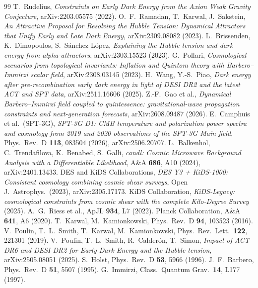 \documentclass[11pt]{article}
\begin{document}
\begin{thebibliography}{99}
 T.~Rudelius, \emph{Constraints on Early Dark Energy from the Axion Weak Gravity Conjecture},
arXiv:2203.05575 (2022).
 O.~F.~Ramadan, T.~Karwal, J.~Sakstein, \emph{An Attractive Proposal for Resolving the Hubble
Tension: Dynamical Attractors that Unify Early and Late Dark Energy}, arXiv:2309.08082 (2023).
 L.~Brissenden, K.~Dimopoulos, S.~S\'anchez L\'opez, \emph{Explaining the Hubble tension and
dark energy from alpha-attractors}, arXiv:2303.15523 (2023).
 G.~Pollari, \emph{Cosmological scenarios from topological invariants: Inflation and Quintom theory
with Barbero--Immirzi scalar field}, arXiv:2308.03145 (2023).
 H.~Wang, Y.-S.~Piao, \emph{Dark energy after pre-recombination early dark energy in light of
DESI DR2 and the latest ACT and SPT data}, arXiv:2511.16606 (2025).
 Z.-F.~Gao et al., \emph{Dynamical Barbero--Immirzi field coupled to quintessence: gravitational-wave
propagation constraints and next-generation forecasts}, arXiv:2608.09487 (2026).
 E.~Camphuis et al.\ (SPT-3G), \emph{SPT-3G D1: CMB temperature and polarization
power spectra and cosmology from 2019 and 2020 observations of the SPT-3G Main field}, Phys.\ Rev.\ D
\textbf{113}, 083504 (2026), arXiv:2506.20707.
 L.~Balkenhol, C.~Trendafilova, K.~Benabed, S.~Galli, \emph{candl: Cosmic
Microwave Background Analysis with a Differentiable Likelihood}, A\&A \textbf{686}, A10 (2024),
arXiv:2401.13433.
 DES and KiDS Collaborations, \emph{DES Y3 + KiDS-1000: Consistent cosmology
combining cosmic shear surveys}, Open J.\ Astrophys.\ (2023), arXiv:2305.17173.
 KiDS Collaboration, \emph{KiDS-Legacy: cosmological constraints from cosmic
shear with the complete Kilo-Degree Survey} (2025).
 A.~G.~Riess et al., ApJL \textbf{934}, L7 (2022).
 Planck Collaboration, A\&A \textbf{641}, A6 (2020).
 T.~Karwal, M.~Kamionkowski, Phys.\ Rev.\ D \textbf{94}, 103523 (2016).
 V.~Poulin, T.~L.~Smith, T.~Karwal, M.~Kamionkowski,
  Phys.\ Rev.\ Lett.\ \textbf{122}, 221301 (2019).
 V.~Poulin, T.~L.~Smith, R.~Calder\'on, T.~Simon,
  \emph{Impact of ACT DR6 and DESI DR2 for Early Dark Energy and the Hubble tension},
  arXiv:2505.08051 (2025).
 S.~Holst, Phys.\ Rev.\ D \textbf{53}, 5966 (1996).
 J.~F.~Barbero, Phys.\ Rev.\ D \textbf{51}, 5507 (1995).
 G.~Immirzi, Class.\ Quantum Grav.\ \textbf{14}, L177 (1997).

\end{thebibliography}
\end{document}
